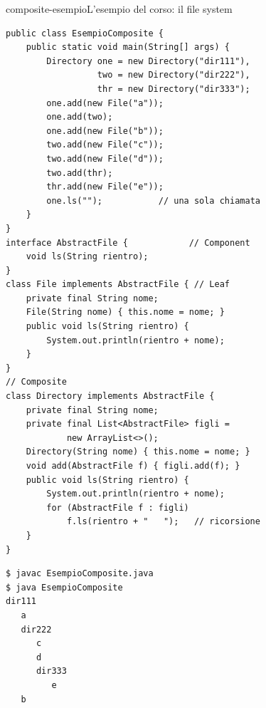 \begin{programma}{composite-esempio}{L'esempio del corso: il file system}
\begin{lstlisting}[style=javacs, name=EsempioComposite.java]
public class EsempioComposite {
    public static void main(String[] args) {
        Directory one = new Directory("dir111"),
                  two = new Directory("dir222"),
                  thr = new Directory("dir333");
        one.add(new File("a"));
        one.add(two);
        one.add(new File("b"));
        two.add(new File("c"));
        two.add(new File("d"));
        two.add(thr);
        thr.add(new File("e"));
        one.ls("");           // una sola chiamata
    }
}
interface AbstractFile {            // Component
    void ls(String rientro);
}
class File implements AbstractFile { // Leaf
    private final String nome;
    File(String nome) { this.nome = nome; }
    public void ls(String rientro) {
        System.out.println(rientro + nome);
    }
}
// Composite
class Directory implements AbstractFile {
    private final String nome;
    private final List<AbstractFile> figli =
            new ArrayList<>();
    Directory(String nome) { this.nome = nome; }
    void add(AbstractFile f) { figli.add(f); }
    public void ls(String rientro) {
        System.out.println(rientro + nome);
        for (AbstractFile f : figli)
            f.ls(rientro + "   ");   // ricorsione
    }
}
\end{lstlisting}
\tcblower
{}

\medskip
\begin{lstlisting}[style=shellcs, name=Terminale]
$ javac EsempioComposite.java
$ java EsempioComposite
dir111
   a
   dir222
      c
      d
      dir333
         e
   b
\end{lstlisting}
\end{programma}
